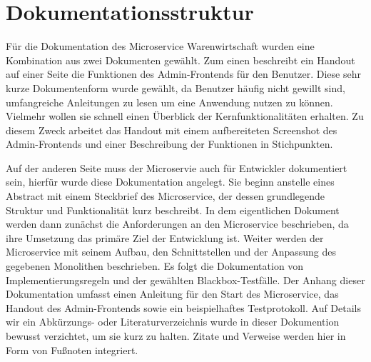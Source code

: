 \section{Dokumentationsstruktur}
\label{sec: Dokumentationsstruktur}

Für die Dokumentation des Microservice Warenwirtschaft wurden eine Kombination aus zwei Dokumenten gewählt. Zum einen beschreibt ein Handout auf einer Seite die Funktionen des Admin-Frontends für den Benutzer. Diese sehr kurze Dokumentenform wurde gewählt, da Benutzer häufig nicht gewillt sind, umfangreiche Anleitungen zu lesen um eine Anwendung nutzen zu können. Vielmehr wollen sie schnell einen Überblick der Kernfunktionalitäten erhalten. Zu diesem Zweck arbeitet das Handout mit einem aufbereiteten Screenshot des Admin-Frontends und einer Beschreibung der Funktionen in Stichpunkten. \par 
Auf der anderen Seite muss der Microservie auch für Entwickler dokumentiert sein, hierfür wurde diese Dokumentation angelegt. Sie beginn anstelle eines Abstract mit einem Steckbrief des Microservice, der dessen grundlegende Struktur und Funktionalität kurz beschreibt. In dem eigentlichen Dokument werden dann zunächst die Anforderungen an den Microservice beschrieben, da ihre Umsetzung das primäre Ziel der Entwicklung ist. Weiter werden der Microservice mit seinem Aufbau, den Schnittstellen und der Anpassung des gegebenen Monolithen beschrieben. Es folgt die Dokumentation von Implementierungsregeln und der gewählten Blackbox-Testfälle. Der Anhang dieser Dokumentation umfasst einen Anleitung für den Start des Microservice, das Handout des Admin-Frontends sowie ein beispielhaftes Testprotokoll. Auf Details wir ein Abkürzungs- oder Literaturverzeichnis wurde in dieser Dokumention bewusst verzichtet, um sie kurz zu halten. Zitate und Verweise werden hier in Form von Fußnoten integriert.